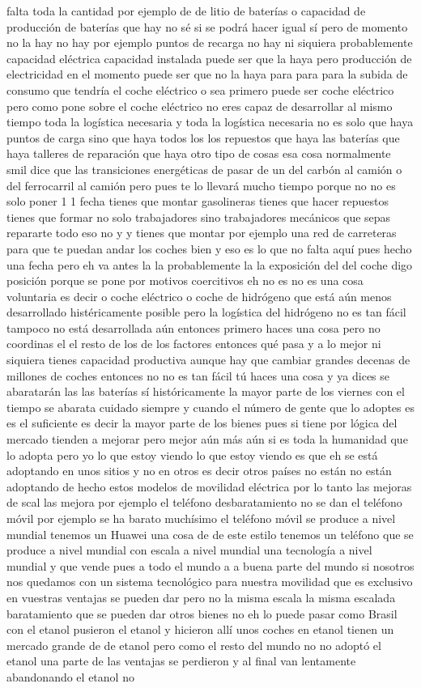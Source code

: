 falta toda la cantidad por ejemplo de de litio de baterías o capacidad de producción de baterías que hay no sé si se podrá hacer igual sí pero de momento no la hay no hay por ejemplo puntos de recarga no hay ni siquiera probablemente capacidad eléctrica capacidad instalada puede ser que la haya pero producción de electricidad en el momento puede ser que no la haya para para para la subida de consumo que tendría el coche eléctrico o sea primero puede ser coche eléctrico pero como pone sobre el coche eléctrico no eres capaz de desarrollar al mismo tiempo toda la logística necesaria y toda la logística necesaria no es solo que haya puntos de carga sino que haya todos los los repuestos que haya las baterías que haya talleres de reparación que haya otro tipo de cosas esa cosa normalmente smil dice que las transiciones energéticas de pasar de un del carbón al camión o del ferrocarril al camión pero pues te lo llevará mucho tiempo porque no no es solo poner 1 1 fecha tienes que montar gasolineras tienes que hacer repuestos tienes que formar no solo trabajadores sino trabajadores mecánicos que sepas repararte todo eso no y y tienes que montar por ejemplo una red de carreteras para que te puedan andar los coches bien y eso es lo que no falta aquí pues hecho una fecha pero eh va antes la la probablemente la la exposición del del coche digo posición porque se pone por motivos coercitivos eh no es no es una cosa voluntaria es decir o coche eléctrico o coche de hidrógeno que está aún menos desarrollado histéricamente posible pero la logística del hidrógeno no es tan fácil tampoco no está desarrollada aún entonces primero haces una cosa pero no coordinas el el resto de los de los factores entonces qué pasa y a lo mejor ni siquiera tienes capacidad productiva aunque hay que cambiar grandes decenas de millones de coches entonces no no es tan fácil tú haces una cosa y ya dices se abaratarán las las baterías sí históricamente la mayor parte de los viernes con el tiempo se abarata cuidado siempre y cuando el número de gente que lo adoptes es es el suficiente es decir la mayor parte de los bienes pues si tiene por lógica del mercado tienden a mejorar pero mejor aún más aún si es toda la humanidad que lo adopta pero yo lo que estoy viendo lo que estoy viendo es que eh se está adoptando en unos sitios y no en otros es decir otros países no están no están adoptando de hecho estos modelos de movilidad eléctrica por lo tanto las mejoras de scal las mejora por ejemplo el teléfono desbaratamiento no se dan el teléfono móvil por ejemplo se ha barato muchísimo el teléfono móvil se produce a nivel mundial tenemos un Huawei una cosa de de este estilo tenemos un teléfono que se produce a nivel mundial con escala a nivel mundial una tecnología a nivel mundial y que vende pues a todo el mundo a a buena parte del mundo si nosotros nos quedamos con un sistema tecnológico para nuestra movilidad que es exclusivo en vuestras ventajas se pueden dar pero no la misma escala la misma escalada baratamiento que se pueden dar otros bienes no eh lo puede pasar como Brasil con el etanol pusieron el etanol y hicieron allí unos coches en etanol tienen un mercado grande de de etanol pero como el resto del mundo no no adoptó el etanol una parte de las ventajas se perdieron y al final van lentamente abandonando el etanol no 